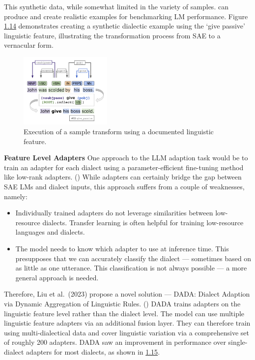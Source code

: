 \documentclass[
  letterpaper,
  DIV=11,
  numbers=noendperiod,
  oneside]{scrreprt}
\theoremstyle{remark}
\begin{document}
This synthetic data, while somewhat limited in the variety of samples.
can produce and create realistic examples for benchmarking LM
performance. Figure \hyperref[fig:synthetic_example]{1.14} demonstrates
creating a synthetic dialectic example using the `give passive'
linguistic feature, illustrating the transformation process from SAE to
a vernacular form.

\begin{figure}

{\centering \includegraphics[width=0.4\textwidth,height=\textheight]{src/Figures/MV3.png}

}

\caption{Execution of a sample transform using a documented linguistic
feature.}

\end{figure}%

\textbf{Feature Level Adapters} One approach to the LLM adaption task
would be to train an adapter for each dialect using a
parameter-efficient fine-tuning method like low-rank adapters.
() While adapters can certainly
bridge the gap between SAE LMs and dialect inputs, this approach suffers
from a couple of weaknesses, namely:

\begin{itemize}
\item
  Individually trained adapters do not leverage similarities between
  low-resource dialects. Transfer learning is often helpful for training
  low-resource languages and dialects.
\item
  The model needs to know which adapter to use at inference time. This
  presupposes that we can accurately classify the dialect --- sometimes
  based on as little as one utterance. This classification is not always
  possible --- a more general approach is needed.
\end{itemize}

Therefore, Liu et al.~(2023) propose a novel solution --- DADA: Dialect
Adaption via Dynamic Aggregation of Linguistic Rules.
() DADA trains adapters on
the linguistic feature level rather than the dialect level. The model
can use multiple linguistic feature adapters via an additional fusion
layer. They can therefore train using multi-dialectical data and cover
linguistic variation via a comprehensive set of roughly 200 adapters.
DADA saw an improvement in performance over single-dialect adapters for
most dialects, as shown in \hyperref[fig:dada_performance]{1.15}.
\end{document}
